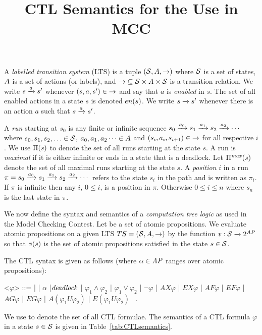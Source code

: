 \documentclass{article}
\title{CTL Semantics for the Use in MCC}
\begin{document}
\maketitle



A \emph{labelled transition system} (LTS) is a 
tuple $(\mathcal{S}, A, \mathcal{\rightarrow})$ where $\mathcal{S}$ is a 
set of states, $A$ is a set of actions (or labels), 
and $\mathcal{\rightarrow}{} \subseteq \mathcal{S} \times A \times \mathcal{S}$ is a transition relation. We write $s \rtrans[a] s'$ 
whenever $(s,a,s') \in \mathcal{\rightarrow}$ and say that $a$ is \emph{enabled} in $s$.
The set of all enabled actions in a state $s$ is denoted $en(s)$.
We write $s \rtrans s'$ whenever there is an action $a$ such that
$s \rtrans[a] s'$.

A \emph{run} starting at $s_0$ is any finite or infinite sequence
$s_0 \rtrans[a_0] s_1 \rtrans[a_1] s_2 \rtrans[a_2] \cdots$ where
$s_0, s_1, s_2, \ldots \in \mathcal{S}$, 
$a_0, a_1, a_2 \cdots \in A$ and
$(s_i,a_i,s_{i+1}) \in \mathcal{\rightarrow}$ for all respective $i$.
We use $\Pi(s)$ to denote the set of all runs starting at the state $s$.
A run is \emph{maximal} if it is either infinite or ends in a state that
is a deadlock.  Let $\Pi^{\mathit{max}}(s)$ denote the set of all maximal 
runs starting at the state $s$.
A \emph{position} $i$ in a run $\pi = 
s_0 \rtrans[a_0] s_1 \rtrans[a_1] s_2 \rtrans[a_2] \cdots$
refers to the state $s_i$ in the path and is written as $\pi_i$.
If $\pi$ is infinite then any $i$, $0 \leq i$, is a position in $\pi$.
Otherwise $0 \leq i \leq n$ where $s_n$ is the last state in $\pi$.

We now define the syntax and semantics of a \emph{computation tree logic} 
as used in the Model Checking Contest.
Let \props be a set of atomic propositions.
We evaluate atomic propositions on a given LTS
$TS = (\mathcal{S}, A, \mathcal{\rightarrow})$ 
by the function $\mathit{v} : \mathcal{S} \xrightarrow{} 2^{\mathit{AP}}$ so that
 $\mathit{v}(s)$ is the set of atomic propositions satisfied 
in the state $s \in \mathcal{S}$.

The CTL syntax is given as follows (where $\alpha \in \mathit{AP}$ ranges over atomic propositions):
\newcommand{\indalt}[1][2]{\\\hspace*{1pt}\textbar\hspace*{3.5pt}}
\begin{grammar}
    \let\syntleft\relax
    \let\syntright\relax

    <$\varphi$> ::= \true | \false | $\alpha$ |$\mathit{deadlock}$ | $\varphi_{1} \land \varphi_{2}$ | $\varphi_{1} \lor \varphi_{2}$ | $ \neg\varphi$ 
| $\mathit{AX}\varphi$ | $\mathit{EX}\varphi$ | $\mathit{AF}\varphi$ | $\mathit{EF}\varphi$ | $\mathit{AG}\varphi$ | $\mathit{EG}\varphi$ | $\mathit{A}(\varphi_1\mathit{U}\varphi_2)$ | $\mathit{E}(\varphi_1\mathit{U}\varphi_2)$ \ .
\end{grammar}
We use \ctlformulas to denote the set of all CTL formulae.
The semantics of a CTL formula $\varphi$ in a state $s \in \mathcal{S}$ 
is given in Table~\ref{tab:CTLsemantics}. 
\end{document}
